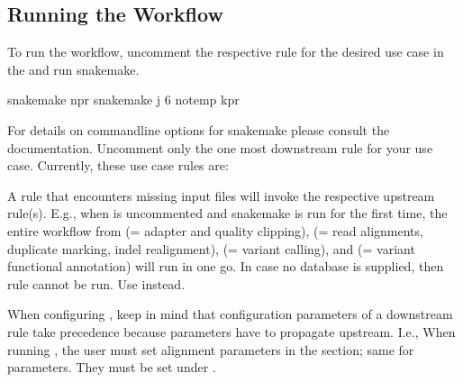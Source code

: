\documentclass[letterpaper,10pt,english]{sphinxmanual}
\begin{document}
\subsection{Running the Workflow}
\label{\detokenize{index:running-the-workflow}}
To run the workflow, un\sphinxhyphen{}comment the respective rule for the desired use case in the  and run snakemake.

\begin{sphinxVerbatim}[commandchars=\\\{\}]
\PYGZdl{} snakemake \textendash{}npr
\PYGZdl{} snakemake \textendash{}j 6 \PYGZhy{}\PYGZhy{}notemp \PYGZhy{}kpr
\end{sphinxVerbatim}

For details on commandline options for snakemake please consult the  documentation. Un\sphinxhyphen{}comment only the one most downstream rule for your use case. Currently, these use case rules are:

\begin{sphinxVerbatim}[commandchars=\\\{\}]
\end{sphinxVerbatim}

A rule that encounters missing input files will invoke the respective upstream rule(s). E.g., when  is uncommented and snakemake is run for the first time, the entire workflow from  (= adapter and quality clipping),  (= read alignments, duplicate marking, indel realignment),  (= variant calling), and  (= variant functional annotation) will run in one go.
In case no  database is supplied, then rule  cannot be run. Use  instead.

When configuring , keep in mind that configuration parameters of a downstream rule take precedence because parameters have to propagate upstream. I.e., When running , the user must set alignment parameters in the  section; same for  parameters. They must be set under .
\end{document}
